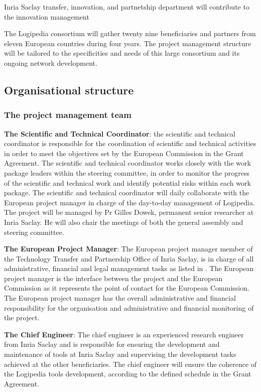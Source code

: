 {\color{red} Inria Saclay transfer, innovation, and partnetship
  department will contribute to the innovation management}




The Logipedia consortium will gather twenty nine beneficiaries and partners
from eleven European countries during four years. The project management
structure will be tailored to the specificities and needs of this
large consortium and its ongoing network development.

\subsection{Organisational structure}

\subsubsection*{The project management team}

{\bf The Scientific and Technical Coordinator}: the scientific and
technical coordinator is responsible for the coordination of
scientific and technical activities in order to meet the objectives
set by the European Commission in the Grant Agreement. The scientific
and technical coordinator works closely with the work package leaders
within the steering committee, in order to monitor the progress of the
scientific and technical work and identify potential risks within each
work package. The scientific and technical coordinator will daily
collaborate with the European project manager in charge of the
day-to-day management of Logipedia. The project will be managed by Pr
Gilles Dowek, permanent senior researcher at Inria Saclay. He will
also chair the meetings of both the general assembly and steering
committee.

{\bf The European Project Manager}: The European project manager
member of the Technology Transfer and Partnership Office of Inria
Saclay, is in charge of all administrative, financial and legal
management tasks as listed in . The
European project manager is the interface between the project and the
European Commission as it represents the point of contact for the
European Commission. The European project manager has the overall
administrative and financial responsibility for the organisation and
administrative and financial monitoring of the project.

{\bf The Chief Engineer}: The chief engineer is an experienced
research engineer from Inria Saclay and is responsible for ensuring
the development and maintenance of tools at Inria Saclay and
supervising the development tasks achieved at the other
beneficiaries. The chief engineer will ensure the coherence of the
Logipedia tools development, according to the defined schedule in the
Grant Agreement.

